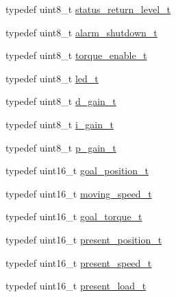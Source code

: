 \begin{DoxyCompactItemize}
\item 
typedef uint8\+\_\+t \hyperlink{structdynamixel_1_1servos_1_1_model_traits_3_01_xl320_01_4_1_1_c_t_a8e8ea090a164c6277ea540bfc78717ec}{status\+\_\+return\+\_\+level\+\_\+t}
\item 
typedef uint8\+\_\+t \hyperlink{structdynamixel_1_1servos_1_1_model_traits_3_01_xl320_01_4_1_1_c_t_a500af3f1d165e75fe1b231f7a20e344e}{alarm\+\_\+shutdown\+\_\+t}
\item 
typedef uint8\+\_\+t \hyperlink{structdynamixel_1_1servos_1_1_model_traits_3_01_xl320_01_4_1_1_c_t_a0ca77b888fb8184c4467459ba36ba780}{torque\+\_\+enable\+\_\+t}
\item 
typedef uint8\+\_\+t \hyperlink{structdynamixel_1_1servos_1_1_model_traits_3_01_xl320_01_4_1_1_c_t_a962aedbfb2105b679409b51e8ca68edc}{led\+\_\+t}
\item 
typedef uint8\+\_\+t \hyperlink{structdynamixel_1_1servos_1_1_model_traits_3_01_xl320_01_4_1_1_c_t_a6faeb66c29d811feb3d6fed6d9fded77}{d\+\_\+gain\+\_\+t}
\item 
typedef uint8\+\_\+t \hyperlink{structdynamixel_1_1servos_1_1_model_traits_3_01_xl320_01_4_1_1_c_t_a0a72d5de0c32d648e07bca597dce6592}{i\+\_\+gain\+\_\+t}
\item 
typedef uint8\+\_\+t \hyperlink{structdynamixel_1_1servos_1_1_model_traits_3_01_xl320_01_4_1_1_c_t_aaed4aede15223f5e20b44a6511e83a37}{p\+\_\+gain\+\_\+t}
\item 
typedef uint16\+\_\+t \hyperlink{structdynamixel_1_1servos_1_1_model_traits_3_01_xl320_01_4_1_1_c_t_a51708d773547d52c0509c1fbe5c51f74}{goal\+\_\+position\+\_\+t}
\item 
typedef uint16\+\_\+t \hyperlink{structdynamixel_1_1servos_1_1_model_traits_3_01_xl320_01_4_1_1_c_t_adb924a8f7e3ce26ce5e406e30020582a}{moving\+\_\+speed\+\_\+t}
\item 
typedef uint16\+\_\+t \hyperlink{structdynamixel_1_1servos_1_1_model_traits_3_01_xl320_01_4_1_1_c_t_a5f53d47ed903507c6a2e43e1a51156e2}{goal\+\_\+torque\+\_\+t}
\item 
typedef uint16\+\_\+t \hyperlink{structdynamixel_1_1servos_1_1_model_traits_3_01_xl320_01_4_1_1_c_t_aebfae8249b5b4b23da9f177f4270a9ed}{present\+\_\+position\+\_\+t}
\item 
typedef uint16\+\_\+t \hyperlink{structdynamixel_1_1servos_1_1_model_traits_3_01_xl320_01_4_1_1_c_t_a60db9022534011dc3c1b0846736d09b6}{present\+\_\+speed\+\_\+t}
\item 
typedef uint16\+\_\+t \hyperlink{structdynamixel_1_1servos_1_1_model_traits_3_01_xl320_01_4_1_1_c_t_ad9811c3a56f4bf49a7349c50642efbf5}{present\+\_\+load\+\_\+t}

\end{DoxyCompactItemize}
